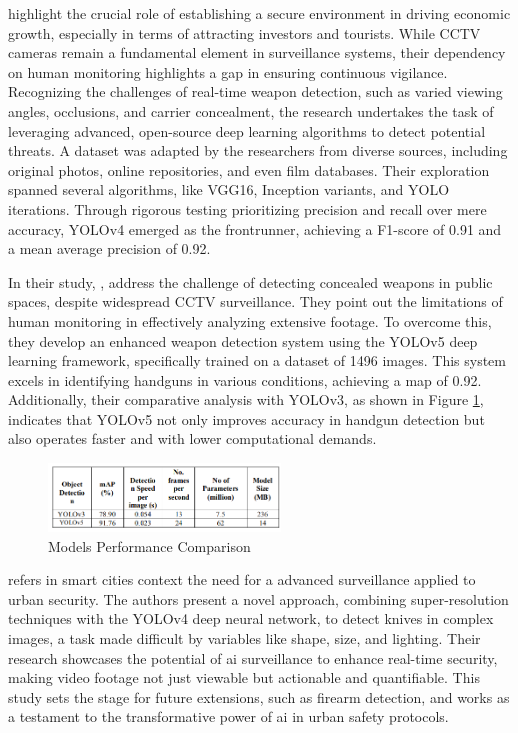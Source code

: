 \citet{rfc4} highlight the crucial role of establishing a secure environment in driving economic growth, especially in terms of attracting investors and tourists. While CCTV cameras remain a fundamental element in surveillance systems, their dependency on human monitoring highlights a gap in ensuring continuous vigilance. Recognizing  the challenges of real-time weapon detection, such as varied viewing angles, occlusions, and carrier concealment, the research undertakes the task of leveraging advanced, open-source deep learning algorithms to detect potential threats. A dataset was adapted by the researchers from diverse sources, including original photos, online repositories, and even film databases. Their exploration spanned several algorithms, like VGG16, Inception variants, and YOLO iterations. Through rigorous testing prioritizing precision and recall over mere accuracy, YOLOv4 emerged as the frontrunner, achieving a F1-score of 0.91 and a mean average precision of 0.92.

In their study, \citet{rfc5}, address the challenge of detecting concealed weapons in public spaces, despite widespread CCTV surveillance. They point out the limitations of human monitoring in effectively analyzing extensive footage. To overcome this, they develop an enhanced weapon detection system using the YOLOv5 deep learning framework, specifically trained on a dataset of 1496 images. This system excels in identifying handguns in various conditions, achieving a \ac{map} of 0.92. Additionally, their comparative analysis with YOLOv3, as shown in Figure \ref{fig:performance-Thangaraj}, indicates that YOLOv5 not only improves accuracy in handgun detection but also operates faster and with lower computational demands.

\begin{figure}[h]
    \centering 
    \includegraphics[width=0.55\textwidth]{figs/performance-Thangaraj.png} 
    \caption{Models Performance Comparison \cite{rfc5}}
    \label{fig:performance-Thangaraj}
\end{figure}

\citet{rfc18} refers in smart cities context the need for a advanced surveillance applied to urban security. The authors present a novel approach, combining super-resolution techniques with the YOLOv4 deep neural network, to detect knives in complex images, a task made difficult by variables like shape, size, and lighting. Their research showcases the potential of \ac{ai} surveillance to enhance real-time security, making video footage not just viewable but actionable and quantifiable. This study sets the stage for future extensions, such as firearm detection, and works as a testament to the transformative power of \ac{ai} in urban safety protocols.

